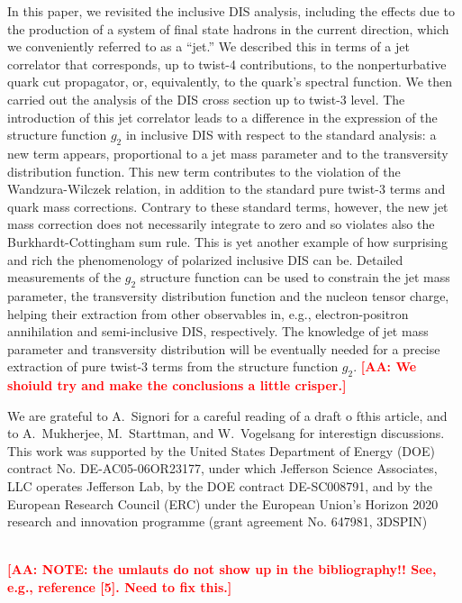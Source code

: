 \documentclass[preprintnumbers,floatfix,nofootinbib]{revtex4}
\def\AAcom#1{{\bf  \textcolor{Red}{[AA: {#1}]}}}
\begin{document}
In this paper, we revisited the inclusive DIS analysis, including the
effects due to the production of a system of final state hadrons in the current direction, which we
conveniently referred to as a ``jet.'' We described this in terms of a jet
correlator that corresponds, up to twist-4 contributions, to the nonperturbative quark cut propagator, or, equivalently, to the quark's spectral function. 
We then carried out the analysis of 
the DIS cross section up to twist-3 level. 
The introduction of this jet correlator
leads to a difference in the expression of the structure function $g_2$ in
inclusive DIS with respect to the standard analysis: a new term appears, proportional to a jet mass
parameter and to the transversity distribution function. This new term
contributes to the violation of the Wandzura-Wilczek relation, in addition to
the standard pure twist-3 terms and quark mass corrections. Contrary to these
standard terms, however, the new jet mass correction does not necessarily integrate to zero and so violates also the
Burkhardt-Cottingham sum rule. This is yet another example of how surprising
and rich the phenomenology of polarized inclusive DIS can be. 
Detailed measurements of the $g_2$ structure
function can be used to constrain the jet mass parameter, the transversity
distribution function and the nucleon tensor charge, helping their extraction from other observables in, e.g.,
electron-positron annihilation and semi-inclusive DIS, respectively. 
The
knowledge of jet
mass parameter and transversity distribution will be eventually needed for a precise
extraction of pure twist-3 terms from the structure function $g_2$.
\AAcom{We shoiuld try and make the conclusions a little crisper.}



\begin{acknowledgments}
We are grateful to A.~Signori for a careful reading of a draft o fthis article, and to A.~Mukherjee, M.~Starttman, and W.~Vogelsang for interestign discussions. This work was supported by the United States Department of Energy (DOE) contract No. DE-AC05-06OR23177,
under which Jefferson Science Associates, LLC operates Jefferson Lab, by the DOE contract DE-SC008791, and 
by the European Research Council (ERC) under the European Union's 
Horizon 2020 research and innovation programme (grant agreement No. 647981,
3DSPIN)
\end{acknowledgments}

\ \\ \AAcom{NOTE: the umlauts do not show up in the bibliography!! See, e.g., reference [5]. Need to fix this.}



\end{document}
